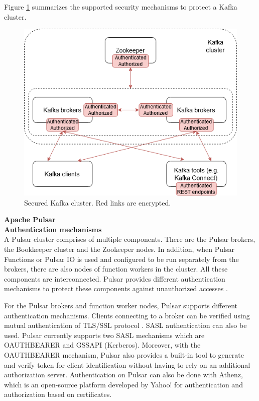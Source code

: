 Figure \ref{fig:securitykafka} summarizes the supported security mechanisms to protect a Kafka cluster.
\begin{figure}[h]
	\centering
	\includegraphics[width=11.5cm]{images/security-kafka.png}
	\caption{Secured Kafka cluster. Red links are encrypted.}
	\label{fig:securitykafka}
\end{figure}

\large \textbf{Apache Pulsar}\\
\normalsize
\textbf{Authentication mechanisms}\\
A Pulsar cluster comprises of multiple components. There are the Pulsar brokers, the Bookkeeper cluster and the Zookeeper nodes. In addition, when Pulsar Functions or Pulsar IO is used and configured to be run separately from the brokers, there are also nodes of function workers in the cluster. All these components are interconnected. Pulsar provides different authentication mechanisms to protect these components against unauthorized accesses \cite{pulsarsecurity}.

For the Pulsar brokers and function worker nodes, Pulsar supports different authentication mechanisms. Clients connecting to a broker can be verified using mutual authentication of TLS/SSL protocol \cite{tls}. SASL authentication \cite{sasl} can also be used. Pulsar currently supports two SASL mechanisms which are OAUTHBEARER and GSSAPI (Kerberos). Moreover, with the OAUTHBEARER mechanism, Pulsar also provides a built-in tool to generate and verify token for client identification without having to rely on an additional authorization server. Authentication on Pulsar can also be done with Athenz, which is an open-source platform developed by Yahoo! for authentication and authorization based on certificates.

